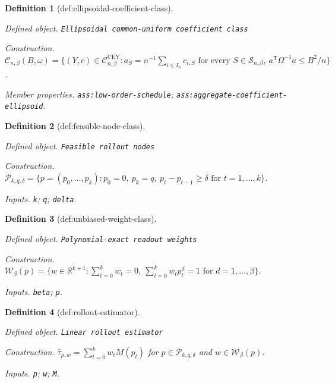 \documentclass{article}
\newtheorem{definition}{Definition}
\begin{document}
\begin{definition}[def:ellipsoidal-coefficient-class]\label{def:ellipsoidal-coefficient-class}
\par\smallskip\noindent\emph{Defined object.} \texttt{Ellipsoidal common-\allowbreak{}uniform coefficient class}
\par\smallskip\noindent\emph{Construction.} \(\mathcal C_{n,\beta}(B,\omega)=\{(Y,c)\in\mathcal C^{\mathrm{CEY}}_{n,\beta}:a_S=n^{-1}\sum_{i\in I_n}c_{i,S}\text{ for every }S\in\mathcal S_{n,\beta},\ a^{\mathsf T}\Omega^{-1}a\le B^2/n\}\).
\par\smallskip\noindent\emph{Member properties.} \texttt{ass:\allowbreak{}low-\allowbreak{}order-\allowbreak{}schedule}; \texttt{ass:\allowbreak{}aggregate-\allowbreak{}coefficient-\allowbreak{}ellipsoid}.
\end{definition}

\begin{definition}[def:feasible-node-class]\label{def:feasible-node-class}
\par\smallskip\noindent\emph{Defined object.} \texttt{Feasible rollout nodes}
\par\smallskip\noindent\emph{Construction.} \(\mathcal P_{k,q,\delta}=\{p=(p_0,\ldots,p_k):p_0=0,\ p_k=q,\ p_t-p_{t-1}\ge\delta\text{ for }t=1,\ldots,k\}\).
\par\smallskip\noindent\emph{Inputs.} \texttt{k}; \texttt{q}; \texttt{delta}.
\end{definition}

\begin{definition}[def:unbiased-weight-class]\label{def:unbiased-weight-class}
\par\smallskip\noindent\emph{Defined object.} \texttt{Polynomial-\allowbreak{}exact readout weights}
\par\smallskip\noindent\emph{Construction.} \(\mathcal W_\beta(p)=\{w\in\mathbb R^{k+1}:\sum_{t=0}^kw_t=0,\ \sum_{t=0}^kw_tp_t^d=1\text{ for }d=1,\ldots,\beta\}\).
\par\smallskip\noindent\emph{Inputs.} \texttt{beta}; \texttt{p}.
\end{definition}

\begin{definition}[def:rollout-estimator]\label{def:rollout-estimator}
\par\smallskip\noindent\emph{Defined object.} \texttt{Linear rollout estimator}
\par\smallskip\noindent\emph{Construction.} \(\widehat\tau_{p,w}=\sum_{t=0}^kw_tM(p_t)\) for \(p\in\mathcal P_{k,q,\delta}\) and \(w\in\mathcal W_\beta(p)\).
\par\smallskip\noindent\emph{Inputs.} \texttt{p}; \texttt{w}; \texttt{M}.
\end{definition}
\end{document}
